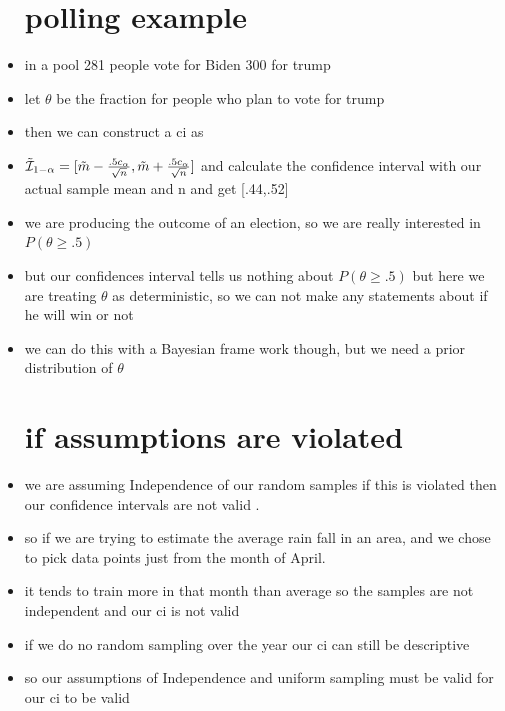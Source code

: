 \documentclass{article}
\begin{document}
\begin{itemize}
\section{polling example}
\item in a pool 281 people vote for Biden 300 for trump 
\item let $\theta$ be the fraction for people who plan to vote for trump
\item then we can construct a ci as \item $\Tilde{\mathcal{I}}_{1-\alpha}=[\Tilde{m}-\frac{.5c_{\alpha}}{\sqrt{n}},\Tilde{m}+\frac{.5c_{\alpha}}{\sqrt{n}}]$ and calculate the confidence interval with our actual sample mean and n and get [.44,.52]
\item we are producing the outcome of an election, so we are really interested in $P(\theta\geq .5)$
\item but our confidences interval tells us nothing about $P(\theta\geq .5)$ but here we are treating $\theta$ as deterministic, so we can not make any statements about if he will win or not 
\item we can do this with a Bayesian frame work though, but we need a prior distribution of $\theta$
\section{if assumptions are violated}
\item we are assuming Independence of our random samples if this is violated then our confidence intervals are not valid .
\item so if we are trying to estimate the average rain fall in an area, and we chose to pick data points just from the month of April.
\item it tends to train more in that month than average so the samples are not independent and our ci is not valid
\item if we do no random sampling over the year our ci can still be descriptive
\item so our assumptions of Independence and uniform sampling must be valid for our ci to be valid  
\end{itemize}
\end{document}
